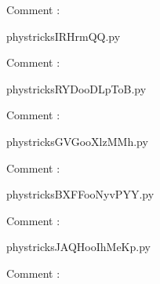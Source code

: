     Comment : 

    \clearpage
    


    \newcommand{\CaptionFigIRHrmQQ}{<+Type your caption here+>}
    \begin{center}
        
    \end{center}
    phystricksIRHrmQQ.py

    Comment : 

    \clearpage
    


    \newcommand{\CaptionFigRYDooDLpToB}{<+Type your caption here+>}
    \begin{center}
        
    \end{center}
    phystricksRYDooDLpToB.py

    Comment : 

    \clearpage
    


    \newcommand{\CaptionFigGVGooXlzMMh}{<+Type your caption here+>}
    \begin{center}
        
    \end{center}
    phystricksGVGooXlzMMh.py

    Comment : 

    \clearpage
    


    \newcommand{\CaptionFigBXFFooNyvPYY}{<+Type your caption here+>}
    \begin{center}
        
    \end{center}
    phystricksBXFFooNyvPYY.py

    Comment : 

    \clearpage
    


    \newcommand{\CaptionFigJAQHooIhMeKp}{<+Type your caption here+>}
    \begin{center}
        
    \end{center}
    phystricksJAQHooIhMeKp.py

    Comment : 

    \clearpage
    

